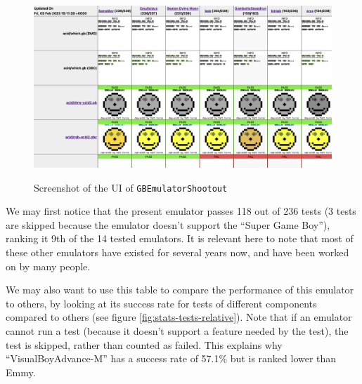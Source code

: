 \documentclass[11pt]{informatics-report}
\begin{document}
\begin{figure}[h]
    \centering
    \includegraphics[width=15cm]{images/gb-shootout}\\
    \caption{Screenshot of the UI of \texttt{GBEmulatorShootout}}
    \label{fig:gb-shootout}
\end{figure}

We may first notice that the present emulator passes 118 out of 236 tests (3 tests are skipped because the emulator doesn't support the ``Super Game Boy''), ranking it 9th of the 14 tested emulators. It is relevant here to note that most of these other emulators have existed for several years now, and have been worked on by many people.

We may also want to use this table to compare the performance of this emulator to others, by looking at its success rate for tests of different components compared to others (see figure \ref{fig:stats-tests-relative}). Note that if an emulator cannot run a test (because it doesn't support a feature needed by the test), the test is skipped, rather than counted as failed. This explains why \mbox{``VisualBoyAdvance-M''} has a success rate of 57.1\% but is ranked lower than Emmy.
\end{document}
